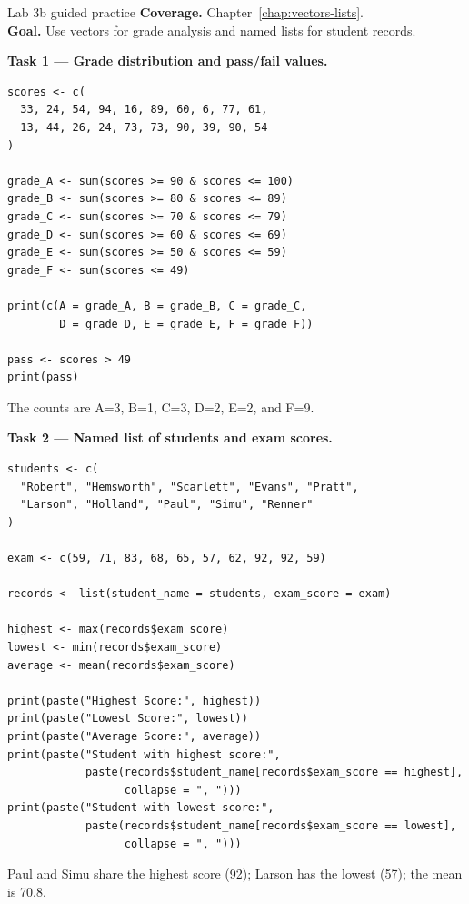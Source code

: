 
\begin{labproject}{Lab 3b guided practice}
\textbf{Coverage.} Chapter~\ref{chap:vectors-lists}.\\
\textbf{Goal.} Use vectors for grade analysis and named lists for student records.

\textbf{Task 1 --- Grade distribution and pass/fail values.}

\begin{lstlisting}[style=dsr]
scores <- c(
  33, 24, 54, 94, 16, 89, 60, 6, 77, 61,
  13, 44, 26, 24, 73, 73, 90, 39, 90, 54
)

grade_A <- sum(scores >= 90 & scores <= 100)
grade_B <- sum(scores >= 80 & scores <= 89)
grade_C <- sum(scores >= 70 & scores <= 79)
grade_D <- sum(scores >= 60 & scores <= 69)
grade_E <- sum(scores >= 50 & scores <= 59)
grade_F <- sum(scores <= 49)

print(c(A = grade_A, B = grade_B, C = grade_C,
        D = grade_D, E = grade_E, F = grade_F))

pass <- scores > 49
print(pass)
\end{lstlisting}

The counts are A=3, B=1, C=3, D=2, E=2, and F=9.

\textbf{Task 2 --- Named list of students and exam scores.}

\begin{lstlisting}[style=dsr]
students <- c(
  "Robert", "Hemsworth", "Scarlett", "Evans", "Pratt",
  "Larson", "Holland", "Paul", "Simu", "Renner"
)

exam <- c(59, 71, 83, 68, 65, 57, 62, 92, 92, 59)

records <- list(student_name = students, exam_score = exam)

highest <- max(records$exam_score)
lowest <- min(records$exam_score)
average <- mean(records$exam_score)

print(paste("Highest Score:", highest))
print(paste("Lowest Score:", lowest))
print(paste("Average Score:", average))
print(paste("Student with highest score:",
            paste(records$student_name[records$exam_score == highest],
                  collapse = ", ")))
print(paste("Student with lowest score:",
            paste(records$student_name[records$exam_score == lowest],
                  collapse = ", ")))
\end{lstlisting}

Paul and Simu share the highest score (92); Larson has the lowest (57); the mean is 70.8.


\end{labproject}
